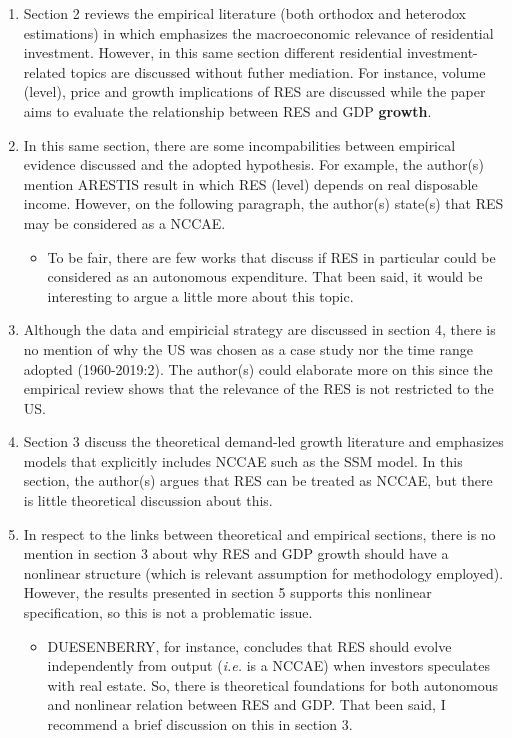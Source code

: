 \documentclass[11pt]{article}
\begin{document}
\begin{enumerate}
\item Section 2 reviews the empirical literature (both orthodox and heterodox estimations) in which emphasizes the macroeconomic relevance of residential investment. However, in this same section different residential investment-related topics are discussed without futher mediation. For instance, volume (level), price and growth implications of RES are discussed while the paper aims to evaluate the relationship between RES and GDP \textbf{growth}.

\item In this same section, there are some incompabilities between empirical evidence discussed and the adopted hypothesis. For example, the author(s) mention ARESTIS result in which RES (level) depends on real disposable income. However, on the following paragraph, the author(s) state(s) that RES may be considered as a NCCAE.

\begin{itemize}
\item To be fair, there are few works that discuss if RES in particular could be considered as an autonomous expenditure. That been said, it would be interesting to argue a little more about this topic.
\end{itemize}

\item Although the data and empiricial strategy are discussed in section 4, there is no mention of why the US was chosen as a case study nor the time range adopted (1960-2019:2). The author(s) could elaborate more on this since the empirical review shows that the relevance of the RES is not restricted to the US.

\item Section 3 discuss the theoretical demand-led growth literature and emphasizes models that explicitly includes NCCAE such as the SSM model. In this section, the author(s) argues that RES can be treated as NCCAE, but there is little theoretical discussion about this.

\item In respect to the links between theoretical and empirical sections, there is no mention in section 3 about why RES and GDP growth should have a nonlinear structure (which is relevant assumption for methodology employed). However, the results presented in section 5 supports this nonlinear specification, so this is not a problematic issue.

\begin{itemize}
\item DUESENBERRY, for instance, concludes that RES should evolve independently from output (\emph{i.e.} is a NCCAE) when investors speculates with real estate. So, there is theoretical foundations for both autonomous and nonlinear relation between RES and GDP. That been said, I recommend a brief discussion on this in section 3.
\end{itemize}


\end{enumerate}
\end{document}
